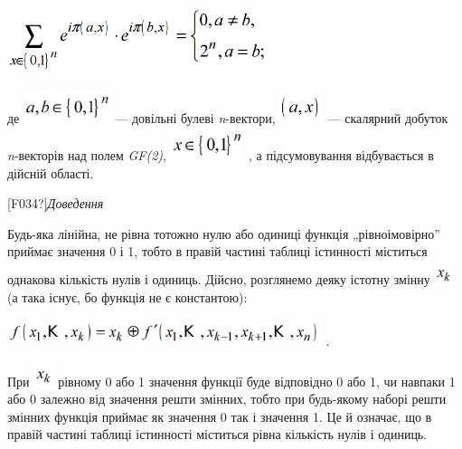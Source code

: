 {\centering 
\includegraphics[width=3in,height=0.75in]{crypt-img/crypt-img131.png} \par}

де  \includegraphics[width=1.0071in,height=0.3827in]{crypt-img/crypt-img132.png}
 --- довільні булеві \textit{n}{}-вектори, 
\includegraphics[width=0.5071in,height=0.3354in]{crypt-img/crypt-img133.png}  ---
скалярний добуток \textit{n}{}-векторів над полем \textit{GF(2)}, 
\includegraphics[width=0.8508in,height=0.3866in]{crypt-img/crypt-img134.png} ,
а підсумовування відбувається в дійсній області.

\textlatin{[F034?]}\textit{Доведення}

 Будь-яка лінійна, не рівна тотожно  нулю  або одиниці функція „рівноімовірно”
приймає значення 0 і 1, тобто в правій частині таблиці істинності міститься
однакова кількість нулів і одиниць. Дійсно, розглянемо деяку істотну змінну 
\includegraphics[width=0.228in,height=0.2744in]{crypt-img/crypt-img135.png}  (а
така існує, бо функція не є константою):

{\centering
 \includegraphics[width=3.6264in,height=0.3071in]{crypt-img/crypt-img136.png} .
\par}

При 
\includegraphics[width=0.2319in,height=0.2709in]{crypt-img/crypt-img137.png} 
рівному 0 або 1 значення функції буде відповідно  0 або 1, чи навпаки   1 або 0
 залежно від значення решти змінних, тобто при будь-якому наборі решти змінних
функція приймає як  значення  0 так і значення 1. Це й означає, що в правій
частині таблиці істинності міститься рівна кількість нулів і одиниць.


